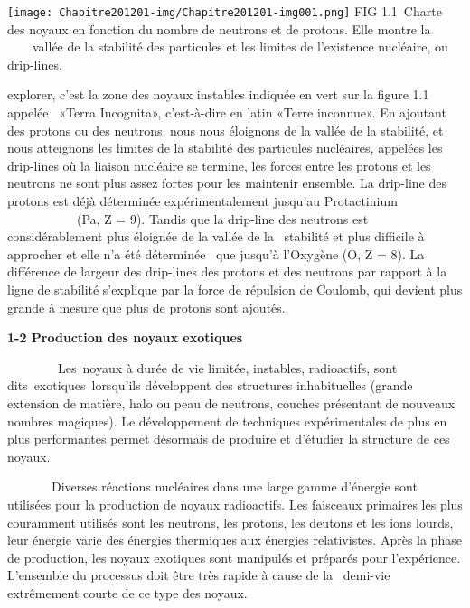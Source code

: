 \documentclass[a4paper]{article}
\begin{document}
 \texttt{[image: Chapitre201201-img/Chapitre201201-img001.png]} FIG 1.1~Charte des noyaux
en fonction du nombre de neutrons et de protons. Elle montre la \ \ \ \ vallée de la stabilité des particules et les
limites de l’existence nucléaire, ou {\textquotedbl}drip-lines{\textquotedbl}.


\bigskip

explorer, c’est la zone des noyaux instables indiquée en vert sur la figure 1.1 appelée \ «Terra Incognita»,
c’est-à-dire en latin «Terre inconnue». En ajoutant des protons ou des neutrons, nous nous éloignons de la vallée de la
stabilité, et nous atteignons les limites de la stabilité des particules nucléaires, appelées les
{\textquotedbl}drip-lines{\textquotedbl} où la liaison nucléaire se termine, les forces entre les protons et les
neutrons ne sont plus assez fortes pour les maintenir ensemble. La drip-line des protons est déjà déterminée
expérimentalement jusqu’au Protactinium \ \ \ \ \ \ \ \ \ \ \ (Pa, Z = 9). Tandis que la drip-line des neutrons est
considérablement plus éloignée de la vallée de la \ stabilité et plus difficile à approcher et elle n’a été déterminée
\ que jusqu’à l’Oxygène (O, Z = 8). La différence de largeur des drip-lines des protons et des neutrons par rapport à
la ligne de stabilité s’explique par la force de répulsion de Coulomb, qui devient plus grande à mesure que plus de
protons sont ajoutés.


\bigskip


\bigskip


\bigskip


\bigskip

\textbf{1-2 Production des noyaux exotiques}

\ \ \ \ \ \ \ \ Les\textcolor[rgb]{0.12941177,0.14509805,0.16078432}{~noyaux à durée de vie limitée, instables,
radioactifs, sont dits~exotiques~lorsqu'ils développent des structures inhabituelles (grande extension de matière, halo
ou peau de neutrons, couches présentant de nouveaux nombres magiques).} Le développement de techniques expérimentales
de plus en plus performantes permet désormais de produire et d’étudier la structure de ces noyaux.

\ \ \ \ \ \ \ Diverses réactions nucléaires dans une large gamme d'énergie sont utilisées pour la production de noyaux
radioactifs. Les faisceaux primaires les plus couramment utilisés sont les neutrons, les protons, les deutons et les
ions lourds, leur énergie varie des énergies thermiques aux énergies relativistes. Après la phase de production, les
noyaux exotiques sont manipulés et préparés pour l'expérience. L'ensemble du processus doit être très rapide à cause de
la \ demi-vie extrêmement courte de ce type des noyaux.
\end{document}
